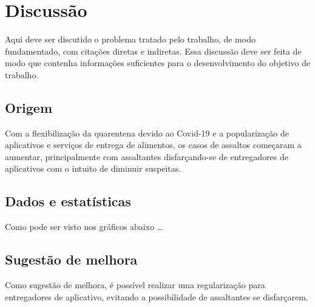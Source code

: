 \section{Discussão}

    Aqui deve ser discutido o problema tratado pelo trabalho, de modo fundamentado,
    com citações diretas e indiretas. Essa discussão deve ser feita de modo que
    contenha informações suficientes para o desenvolvimento do objetivo de trabalho.

    \subsection{Origem}

        Com a flexibilização da quarentena devido ao Covid-19 e a popularização de aplicativos
        e serviços de entrega de alimentos, os casos de assaltos começaram a aumentar,
        principalmente com assaltantes disfarçando-se de entregadores de aplicativos com o
        intuito de diminuir suspeitas.

    \subsection{Dados e estatísticas}

        Como pode ser visto nos gráficos abaixo \ldots

    \subsection{Sugestão de melhora}

        Como sugestão de melhora, é possível realizar uma regularização para entregadores de
        aplicativo, evitando a possibilidade de assaltantes se disfarçarem.